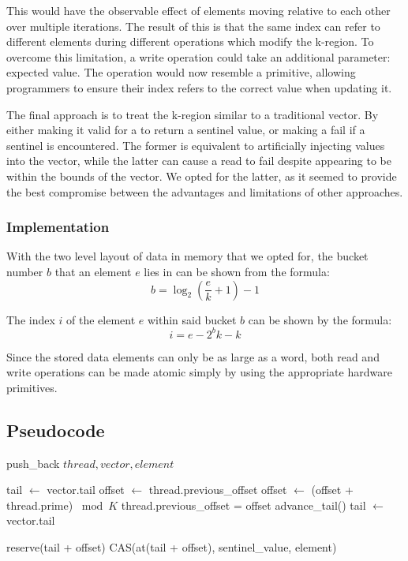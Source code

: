 \documentclass{sigplanconf}
\begin{document}
This would have the observable effect of elements moving relative to each other over multiple iterations. The result of this is that the same index can refer to different elements during different operations which modify the k-region. To overcome this limitation, a write operation could take an additional parameter: expected value. The operation would now resemble a  primitive, allowing programmers to ensure their index refers to the correct value when updating it.

The final approach is to treat the k-region similar to a traditional vector. By either making it valid for a  to return a sentinel value, or making a  fail if a sentinel is encountered. The former is equivalent to artificially injecting values into the vector, while the latter can cause a read to fail despite appearing to be within the bounds of the vector. We opted for the latter, as it seemed to provide the best compromise between the advantages and limitations of other approaches.

\subsubsection{Implementation}

With the two level layout of data in memory that we opted for, the bucket number $b$ that an element $e$ lies in can be shown from the formula:
  $$ b = \log_2\left(\frac{e}{k}+1\right)-1 $$

The index $i$ of the element $e$ within said bucket $b$ can be shown by the formula:
  $$ i = e - 2^{b}k - k $$

Since the stored data elements can only be as large as a word, both read and write operations can be made atomic simply by using the appropriate hardware primitives.

\subsection{Pseudocode}

\newcommand{\as}{$\leftarrow$ }
\newcommand{\eq}{$=$ }

\begin{algorithm}
\caption{push\_back $thread, vector, element$}
\begin{algorithmic}[1]
\STATE tail \as vector.tail
\REPEAT
  \STATE offset \as thread.previous\_offset
  \WHILE{at(tail + offset) \eq sentinel\_value}
    \STATE offset \as (offset + thread.prime) $\bmod{K}$
    \STATE thread.previous\_offset = offset
    \IF{offset \eq 0}
      \STATE advance\_tail()
      \STATE tail \as vector.tail
    \ENDIF
  \ENDWHILE

  \STATE reserve(tail + offset)
\UNTIL CAS(at(tail + offset), sentinel\_value, element)
\end{algorithmic}
\label{alg:pushback}
\end{algorithm}
\end{document}
